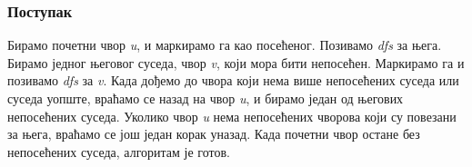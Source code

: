 \documentclass[11pt, oneside, a4paper]{article}
\begin{document}
\subsubsection*{\textbf{Поступак}}
Бирамо почетни чвор \textit{u}, и маркирамо га као посећеног. Позивамо \textit{dfs} за њега. Бирамо једног његовог суседа, чвор \textit{v}, који мора бити непосећен. Маркирамо га и позивамо \textit{dfs} за \textit{v}. Када дођемо до чвора који нема више непосећених суседа или суседа уопште, враћамо се назад на чвор \textit{u}, и бирамо један од његових непосећених суседа. Уколико чвор \textit{u} нема непосећених чворова који су повезани за њега, враћамо се још један корак уназад. Када почетни чвор остане без непосећених суседа, алгоритам је готов.
\begin{figure}[h]
    \centering
\end{figure}
\end{document}
